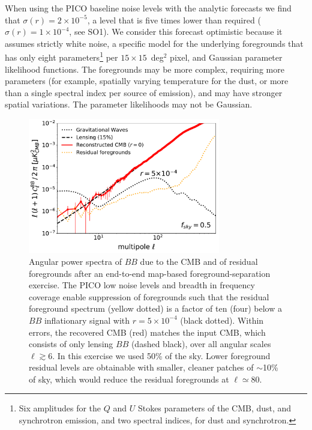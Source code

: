 \documentclass[PICOReport.tex]{subfiles}
\begin{document}
When using the PICO baseline noise levels with the analytic forecasts we find that $\sigma(r) = 2\times 10^{-5}$, a level that is five times lower than required ($\sigma(r) =1 \times 10^{-4}$, see SO1). We consider this forecast optimistic because it assumes strictly white noise, a specific model for the underlying foregrounds that has only eight parameters\footnote{Six amplitudes for the $Q$ and $U$ Stokes parameters of the CMB, dust, and synchrotron emission, and two spectral indices, for dust and synchrotron.} per $15 \times 15$~deg$^{2}$ pixel, and Gaussian parameter likelihood functions. The foregrounds may be more complex, requiring more  parameters (for example, spatially varying temperature for the dust, or more than a single spectral index per source of emission), and may have stronger spatial variations. The parameter likelihoods may not be Gaussian. 
\begin{figure}[h]
\hspace{0.in}
\parbox{3.0in}{\centerline {
\includegraphics[width=3.3in]{images/gnilc_pico_90p92_r0_AL0p15_mc_test3_final.pdf}}}
\hspace{0.2in}
\parbox{3.2in}{
\caption{\captiontext Angular power spectra of $BB$ due to the CMB and of residual foregrounds after an end-to-end map-based foreground-separation exercise. The PICO low noise levels and breadth in frequency coverage enable suppression of foregrounds such that the residual foreground  spectrum  (yellow dotted) is a factor of ten (four) \comblue{[which?]} below a $BB$ inflationary signal with $r=5\times10^{-4}$ (black dotted). Within errors, the recovered CMB (red) matches the input CMB, which consists of only lensing $BB$ (dashed black), over all angular scales $\ell \gtrsim 6$. In this exercise we used 50\% of the sky.  Lower foreground residual levels are obtainable with smaller, cleaner patches of $\sim$10\% of sky, which would reduce the residual foregrounds at $\ell \simeq 80$. 
\label{fig:nilc} } }
\vspace{-0.1in}
\end{figure}
\end{document}
